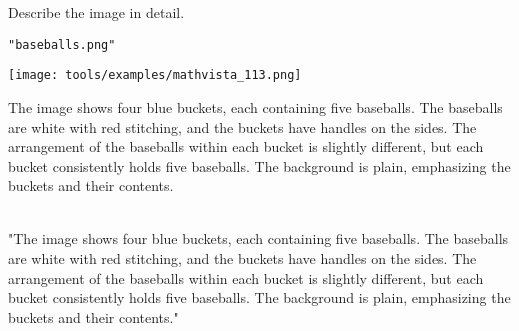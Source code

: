 \begin{textcolorbox}
 Describe the image in detail.

 \texttt{"baseballs.png"}

\vspace{0.2cm}
\texttt{[image: tools/examples/mathvista\_113.png]}
\vspace{0.2cm}


The image shows four blue buckets, each containing five baseballs. The baseballs are white with red stitching, and the buckets have handles on the sides. The arrangement of the baseballs within each bucket is slightly different, but each bucket consistently holds five baseballs. The background is plain, emphasizing the buckets and their contents.
\\\\
\begin{codebox}
{
    "The image shows four blue buckets, each containing five baseballs. The baseballs are white with red stitching, and the buckets have handles on the sides. The arrangement of the baseballs within each bucket is slightly different, but each bucket consistently holds five baseballs. The background is plain, emphasizing the buckets and their contents."
}
\end{codebox}

\end{textcolorbox}